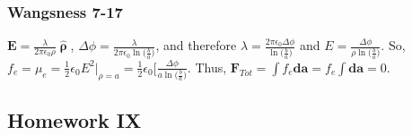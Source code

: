 \documentclass{article}
\theoremstyle{mystyle}
\begin{document}
\subsubsection{Wangsness 7-17}
$\mathbf{E} = \frac{\lambda}{2\pi \epsilon_0 \rho}\hat{\boldsymbol{\uprho}}$, $\Delta\phi = \frac{\lambda}{2\pi \epsilon_0 \ln\big(\frac{b}{a}\big)}$, and therefore $\lambda = \frac{2\pi \epsilon_0 \Delta\phi}{\ln\big(\frac{b}{a}\big)}$ and $E = \frac{\Delta \phi}{\rho \ln\big(\frac{b}{a}\big)}$. So, $f_e = \mu_e = \frac{1}{2} \epsilon_0 E^2\bigg|_{\rho = a} = \frac{1}{2} \epsilon_0 \bigg[ \frac{\Delta\phi}{a \ln\big(\frac{b}{a}\big)}$. Thus, $\mathbf{F}_{Tot} = \int f_e \mathbf{da} = f_e \int \mathbf{da} = 0$.
\subsection{Homework IX}
\end{document}
